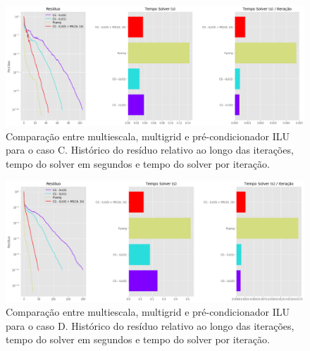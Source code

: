 
\begin{figure}[!htbp]
\label{fig:casoC_2}
\centering
\includegraphics[width=\textwidth]{chap08/figs/casoC_2.png}
\caption{Comparação entre multiescala, multigrid e pré-condicionador ILU para o caso C. Histórico do resíduo relativo ao longo das iterações, tempo do solver em segundos e tempo do solver por iteração. }
\end{figure}




\begin{figure}[!htbp]
\label{fig:casoD_2}
\centering
\includegraphics[width=\textwidth]{chap08/figs/casoD_2.png}
\caption{Comparação entre multiescala, multigrid e pré-condicionador ILU para o caso D. Histórico do resíduo relativo ao longo das iterações, tempo do solver em segundos e tempo do solver por iteração. }
\end{figure}

